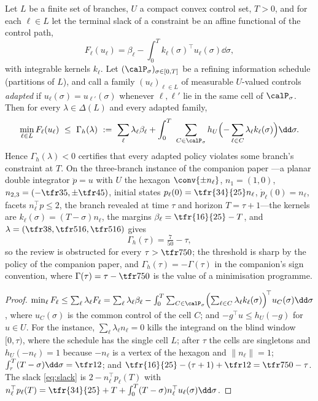 \begin{proposition}\label{prop:integrated}
Let $L$ be a finite set of branches, $U$ a compact convex control set, $T>0$, and for each $\ell\in L$ let the terminal slack of a constraint be an affine functional of the control path,
\begin{equation}\label{eq:slack}
F_\ell(u_\ell)=\beta_\ell-\int_0^T k_\ell(\sigma)^\top u_\ell(\sigma)\dd\sigma,
\end{equation}
with integrable kernels $k_\ell$. Let $(\calP_\sigma)_{\sigma\in[0,T]}$ be a refining information schedule (partitions of $L$), and call a family $(u_\ell)_{\ell\in L}$ of measurable $U$-valued controls \emph{adapted} if $u_\ell(\sigma)=u_{\ell'}(\sigma)$ whenever $\ell,\ell'$ lie in the same cell of $\calP_\sigma$. Then for every $\lambda\in\Delta(L)$ and every adapted family,
\begin{equation}\label{eq:gammah}
\min_{\ell\in L}F_\ell(u_\ell)\ \le\ \Gamma_h(\lambda)\ :=\ \sum_\ell\lambda_\ell\beta_\ell+\int_0^T\ \sum_{C\in\calP_\sigma}h_U\Bigl(-\sum_{\ell\in C}\lambda_\ell k_\ell(\sigma)\Bigr)\dd\sigma .
\end{equation}
Hence $\Gamma_h(\lambda)<0$ certifies that every adapted policy violates some branch's constraint at $T$. On the three-branch instance of the companion paper \cite{Abaee2026cert}---a planar double integrator $\ddot p=u$ with $U$ the hexagon $\conv\{\pm n_\ell\}$, $n_1=(1,0)$, $n_{2,3}=(-\tfr35,\pm\tfr45)$, initial states $p_\ell(0)=\tfr{34}{25}n_\ell$, $\dot p_\ell(0)=n_\ell$, facets $n_\ell^\top p\le2$, the branch revealed at time $\tau$ and horizon $T=\tau+1$---the kernels are $k_\ell(\sigma)=(T-\sigma)n_\ell$, the margins $\beta_\ell=\tfr{16}{25}-T$, and $\lambda=(\tfr38,\tfr5{16},\tfr5{16})$ gives
\begin{equation}\label{eq:gamma3}
\Gamma_h(\tau)=\tfrac{7}{50}-\tau ,
\end{equation}
so the review is obstructed for every $\tau>\tfr7{50}$; the threshold is sharp by the policy of the companion paper, and $\Gamma_h(\tau)=-\Gamma(\tau)$ in the companion's sign convention, where $\Gamma(\tau)=\tau-\tfr7{50}$ is the value of a minimisation programme.
\end{proposition}

\begin{proof}
$\min_\ell F_\ell\le\sum_\ell\lambda_\ell F_\ell=\sum_\ell\lambda_\ell\beta_\ell-\int_0^T\sum_{C\in\calP_\sigma}\Bigl(\sum_{\ell\in C}\lambda_\ell k_\ell(\sigma)\Bigr)^{\!\top}u_C(\sigma)\dd\sigma$, where $u_C(\sigma)$ is the common control of the cell $C$; and $-g^\top u\le h_U(-g)$ for $u\in U$. For the instance, $\sum_\ell\lambda_\ell n_\ell=0$ kills the integrand on the blind window $[0,\tau)$, where the schedule has the single cell $L$; after $\tau$ the cells are singletons and $h_U(-n_\ell)=1$ because $-n_\ell$ is a vertex of the hexagon and $\|n_\ell\|=1$; $\int_\tau^T(T-\sigma)\dd\sigma=\tfr12$; and $\tfr{16}{25}-(\tau+1)+\tfr12=\tfr7{50}-\tau$. The slack \eqref{eq:slack} is $2-n_\ell^\top p_\ell(T)$ with $n_\ell^\top p_\ell(T)=\tfr{34}{25}+T+\int_0^T(T-\sigma)n_\ell^\top u_\ell(\sigma)\dd\sigma$.
\end{proof}

